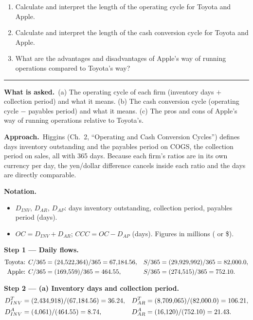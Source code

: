 \documentclass[11pt,a4paper]{article}
\newcommand{\notation}{\par\noindent\textbf{Notation.}}
\newcommand{\step}[2]{\par\medskip\noindent\textbf{Step #1 --- #2.}~}
\newcommand{\asked}{\par\medskip\noindent\textbf{What is asked.}~}
\newcommand{\approach}{\par\smallskip\noindent\textbf{Approach.}~}
\newcommand{\stmtend}{\par\endgroup\nopagebreak\noindent\rule{\linewidth}{0.4pt}\par\medskip}
\begin{document}
\begin{enumerate}
\def\labelenumi{\alph{enumi}.}
\item
  Calculate and interpret the length of the operating cycle for Toyota and Apple.
\item
  Calculate and interpret the length of the cash conversion cycle for Toyota and Apple.
\item
  What are the advantages and disadvantages of Apple's way of running operations compared to
  Toyota's way?
\end{enumerate}
\stmtend

\asked (a) The operating cycle of each firm (inventory days $+$ collection period) and what it
means. (b) The cash conversion cycle (operating cycle $-$ payables period) and what it means. (c)
The pros and cons of Apple's way of running operations relative to Toyota's.

\approach Higgins (Ch.~2, ``Operating and Cash Conversion Cycles'') defines days inventory
outstanding and the payables period on COGS, the collection period on sales, all with 365 days.
Because each firm's ratios are in its own currency per day, the yen/dollar difference cancels
inside each ratio and the days are directly comparable.

\notation
\begin{itemize}
  \item $D_{INV}$, $D_{AR}$, $D_{AP}$: days inventory outstanding, collection period, payables period (days).
  \item $OC = D_{INV} + D_{AR}$; $CCC = OC - D_{AP}$ (days). Figures in millions (\yen{} or \$).
\end{itemize}

\step{1}{Daily flows}
\begin{align}
  \text{Toyota: } C/365 &= (24{,}522{,}364)/365 = 67{,}184.56, & S/365 &= (29{,}929{,}992)/365 = 82{,}000.0, \notag\\
  \text{Apple: } C/365 &= (169{,}559)/365 = 464.55, & S/365 &= (274{,}515)/365 = 752.10. \notag
\end{align}

\step{2}{(a) Inventory days and collection period}
\begin{align}
  D_{INV}^{T} &= (2{,}434{,}918)/(67{,}184.56) = 36.24, & D_{AR}^{T} &= (8{,}709{,}065)/(82{,}000.0) = 106.21, \notag\\
  D_{INV}^{A} &= (4{,}061)/(464.55) = 8.74, & D_{AR}^{A} &= (16{,}120)/(752.10) = 21.43. \notag
\end{align}
\end{document}
